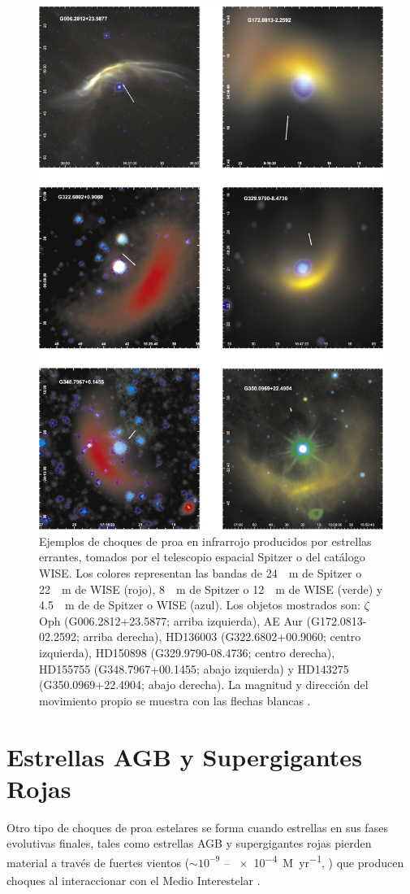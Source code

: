 \begin{figure}
  \centering
  \includegraphics[width=0.7\linewidth]{./Figures/kobulnicky}
  \caption{Ejemplos de choques de proa en infrarrojo producidos por estrellas errantes, tomados por el telescopio espacial Spitzer o del catálogo WISE. Los colores representan las bandas de \SI{24}{\mu.m} de Spitzer o \SI{22}{\mu.m} de WISE (rojo), \SI{8}{\mu.m} de Spitzer o \SI{12}{\mu.m} de WISE (verde) y \SI{4.5}{\mu.m} de de Spitzer o WISE (azul). Los objetos mostrados son: $\zeta$\, Oph (G006.2812+23.5877; arriba izquierda), AE Aur (G172.0813-02.2592; arriba derecha), HD136003 (G322.6802+00.9060; centro izquierda), HD150898 (G329.9790-08.4736; centro derecha), HD155755 (G348.7967+00.1455; abajo izquierda) y HD143275 (G350.0969+22.4904; abajo derecha). La magnitud y dirección del movimiento propio se muestra con las flechas blancas \citep{Kobulnicky:2016}.}
  \label{fig:runaway}
\end{figure}

\section{Estrellas AGB y Supergigantes Rojas}
\label{sec:AGBs}
Otro tipo de choques de proa estelares se forma cuando estrellas en sus fases evolutivas finales, tales como estrellas AGB y supergigantes rojas pierden material a través de fuertes vientos ($\sim 10^{-9}$ -- \SI{e-4}{M_\odot.yr^{-1}}, \citet{Prialnik}) que producen choques al interaccionar con el Medio Interestelar \citep{Cox:2012}.

